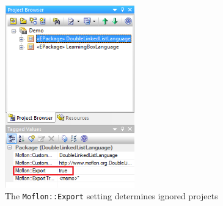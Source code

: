 \begin{stepbystep}
\begin{figure}[htbp]
\begin{center}
\includegraphics[width=0.5\textwidth]{../../org.moflon.doc.handbook.05_miscellaneous/1_grokkingEA/04_exclusion/ea_moflonExportTG}
  \caption{The \texttt{Moflon::Export} setting determines ignored projects}  
  \label{ea:moflonExportTG}
\end{center}
\end{figure}

\end{stepbystep}
